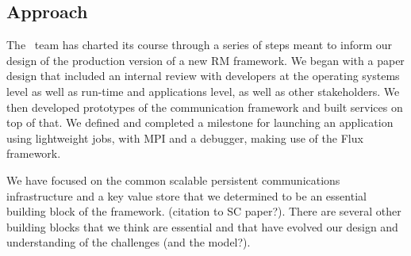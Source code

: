 \subsection{Approach}

The \flux\ team has charted its course through a series of steps
meant to inform our design of the production version of a new
RM framework.  We began with a paper design that included an
internal review with developers at the operating systems level
as well as run-time and applications level, as well as other
stakeholders.  We then developed prototypes of the communication
framework and built services on top of that. We defined and completed
a milestone for launching an application using lightweight jobs,
with MPI and a debugger, making use of the Flux framework.

We have focused on the common scalable persistent communications
infrastructure and a key value store that we determined to be
an essential building block of the framework. (citation to SC paper?).
There are several other building blocks that we think are essential
and that have evolved our design and understanding of the challenges
(and the model?).

